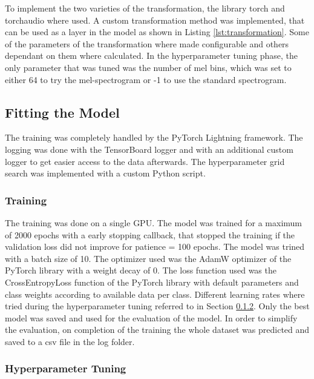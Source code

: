 To implement the two varieties of the transformation, the library torch and torchaudio where used.
A custom transformation method was implemented, that can be used as a layer in the model as shown in 
Listing \ref{lst:transformation}. Some of the parameters of the transformation where made configurable
and others dependant on them where calculated. In the hyperparameter tuning phase, the only parameter
that was tuned was the number of mel bins, which was set to either 64 to try the mel-spectrogram or -1
to use the standard spectrogram.



\subsection{Fitting the Model}%

The training was completely handled by the PyTorch Lightning framework. The logging was done
with the TensorBoard logger and with an additional custom logger to get easier access to the
data afterwards. The hyperparameter grid search was implemented with a custom Python script.

\subsubsection{Training}%

The training was done on a single GPU. The model was trained for a maximum of 2000 epochs
with a early stopping callback, that stopped the training if the validation loss did not improve
for patience = 100 epochs. The model was trined with a batch size of 10. The optimizer used was the AdamW
optimizer of the PyTorch library with a weight decay of 0. The loss function used was the
CrossEntropyLoss function of the PyTorch library with default parameters and class weights
according to available data per class. Different learning rates where tried during the hyperparameter
tuning referred to in Section \ref{hyperparameter_tuning}. Only the best model was saved and used for
the evaluation of the model. In order to simplify the evaluation, on completion of the training
the whole dataset was predicted and saved to a csv file in the log folder.

\subsubsection{Hyperparameter Tuning}%
\label{hyperparameter_tuning}

